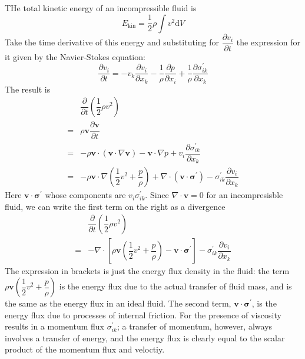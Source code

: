 \documentclass[conference]{IEEEtran}
\theoremstyle{definition}
\theoremstyle{remark}
\begin{document}
    THe total kinetic energy of an incompressible fluid is
    \[
        E_{\text{kin}} = \dfrac12 \rho \int v^2 \mathrm{d} V
    \]
    Take the time derivative of this energy and substituting for $\dfrac{\partial v_i}{\partial t}$ the expression for it given by the Navier-Stokes equation:
    \begin{equation*}
        \dfrac{\partial v_i}{\partial t} = -v_k \dfrac{\partial v_i}{\partial x_k} - \dfrac1\rho \dfrac{\partial p}{\partial x_i} + \dfrac1\rho \dfrac{\partial \sigma^\prime_{ik}}{\partial x_k}
    \end{equation*}
    The result is
    \begin{align*}
        & \dfrac{\partial}{\partial t} \left( \dfrac12 \rho v^2 \right) \\
        =& \rho \mathbf{v} \dfrac{\partial \mathbf{v}}{\partial t} \\
        =& -\rho \mathbf{v} \cdot (\mathbf{v} \cdot \nabla \mathbf{v}) - \mathbf{v} \cdot \nabla p + v_i \dfrac{\partial \sigma^\prime_{ik}}{\partial x_k} \\
        =& -\rho \mathbf{v} \cdot \nabla \left(\dfrac12 v^2 + \dfrac{p}{\rho} \right) + \nabla \cdot (\mathbf{v} \cdot \boldsymbol{\sigma}^\prime) - \sigma_{ik}^\prime \dfrac{\partial v_i}{\partial x_k}
    \end{align*}
    Here $\mathbf{v} \cdot \boldsymbol{\sigma}^\prime$ whose components are $v_i \sigma^\prime_{ik}$. Since $\nabla \cdot \mathbf{v} = 0$ for an incompresisble fluid, we can write the first term on the right as a divergence
    \begin{align*}
        & \dfrac{\partial}{\partial t} (\dfrac12 \rho v^2) \\
        =& -\nabla \cdot \left[ \rho \mathbf{v} \left( \dfrac12v^2 + \dfrac{p}{\rho} \right) - \mathbf{v} \cdot \boldsymbol{\sigma}^\prime \right] - \sigma_{ik}^\prime \dfrac{\partial v_i}{\partial x_k}
    \end{align*}
    The expression in brackets is just the energy flux density in the fluid: the term $\rho \mathbf{v} (\dfrac12 v^2 + \dfrac{p}{\rho})$ is the energy flux due to the actual transfer of fluid mass, and is the same as the energy flux in an ideal fluid. The second term, $\mathbf{v} \cdot \boldsymbol{\sigma}^\prime$, is the energy flux due to processes of internal friction. For the presence of viscosity results in a momentum flux $\sigma_{ik}^\prime$; a transfer of momentum, however, always involves a transfer of energy, and the energy flux is clearly equal to the scalar product of the momentum flux and veloctiy.
\end{document}
